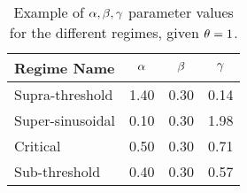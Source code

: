  
\begin{table}[ht]
\begin{center}
\begin{tabular}{l|ccc}
Regime Name & $\alpha$ & $\beta$ & ${\gamma }$ \\ \hline
Supra-threshold&1.40&0.30&0.14 \\
Super-sinusoidal&0.10&0.30&1.98 \\
Critical&0.50&0.30&0.71 \\
Sub-threshold&0.40&0.30&0.57 \\
\end{tabular}
\caption{Example of ${\alpha,\beta,{\gamma } }$ parameter values for the different regimes, given ${ \theta} = 1$.}
\label{tab:regimes}
\end{center}
\end{table}
